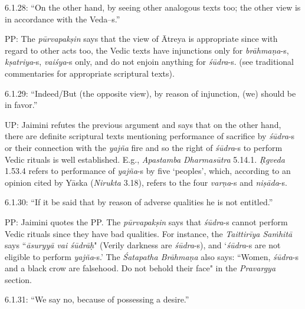 \vspace{.1cm}

6.1.28: “On the other hand, by seeing other analogous texts too; the other view is in accordance with the Veda--s.”

\vspace{.1cm}

PP: The \textit{pūrvapakṣin} says that the view of Ātreya is appropriate since with regard to other acts too, the Vedic texts have injunctions only for \textit{brāhmaṇa}-s, \textit{kṣatriya}-s, \textit{vaiśya}-s only, and do not enjoin anything for \textit{śūdra}-s. (see traditional commentaries for appropriate scriptural texts).

6.1.29: “Indeed/But (the opposite view), by reason of injunction, (we) should be in favor.”

UP: Jaimini refutes the previous argument and says that on the other hand, there are definite scriptural texts mentioning performance of sacrifice by \textit{śūdra}-s or their connection with the \textit{yajña} fire and so the right of \textit{śūdra}-s to perform Vedic rituals is well established. E.g., \textit{Apastamba Dharmasūtra} 5.14.1. \textit{Ṛgveda} 1.53.4 refers to performance of \textit{yajña}-s by five ‘peoples’, which, according to an opinion cited by Yāska (\textit{Nirukta} 3.18), refers to the four \textit{varṇa}-s and \textit{niṣāda}-s.

6.1.30: “If it be said that by reason of adverse qualities he is not entitled.”

PP: Jaimini quotes the PP. The \textit{pūrvapakṣin} says that \textit{śūdra}-s cannot perform Vedic rituals since they have bad qualities. For instance, the \textit{Taittirīya Saṁhitā} says ``\textit{āsuryyā vai śūdrāḥ}" (Verily darkness are \textit{śūdra}-s), and ‘\textit{śūdra}-s are not eligible to perform \textit{yajña}-s.’ The \textit{Śatapatha Brāhmaṇa} also says: ``Women, \textit{śūdra}-s and a black crow are falsehood. Do not behold their face" in the \textit{Pravargya} section.

6.1.31: “We say no, because of possessing a desire.”

